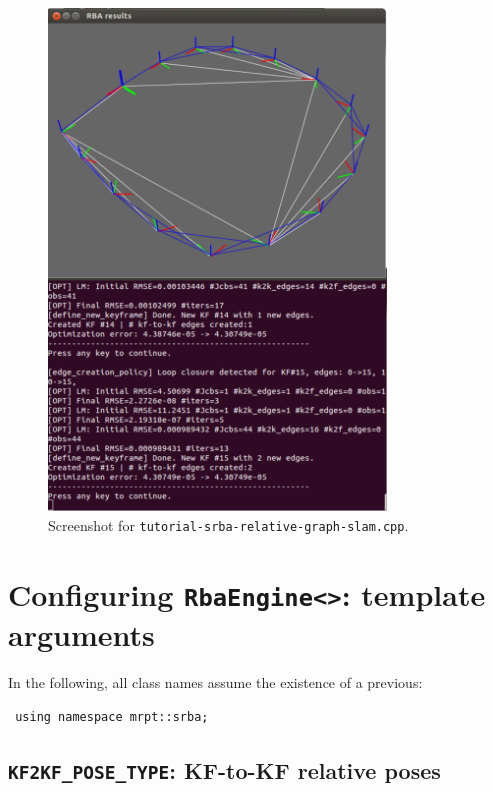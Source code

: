 \documentclass[a4paper,11pt]{article}
\begin{document}
\begin{figure}[h]
\centering
\includegraphics[width=0.8\textwidth]{imgs/screenshot_tutorial_relative-graph-slam-2D.pdf} 
\caption{Screenshot for \texttt{tutorial-srba-relative-graph-slam.cpp}.}
\label{fig:screenshot.tutorial2}
\end{figure}

\newpage

\section{Configuring \texttt{RbaEngine<>}: template arguments}
\label{sect:rba_configs}

In the following, all class names assume the existence of a previous:

\begin{lstlisting}
 using namespace mrpt::srba;
\end{lstlisting}



\subsection{\texttt{KF2KF\_POSE\_TYPE}: KF-to-KF relative poses}
\label{sec:k2k_types}
\end{document}
